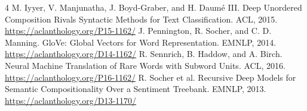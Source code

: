 \documentclass[11pt,letterpaper]{article}
\begin{document}
\begin{thebibliography}{4}
\small
{} M. Iyyer, V. Manjunatha, J. Boyd-Graber, and H. Daum\'e III.
Deep Unordered Composition Rivals Syntactic Methods for Text Classification.
ACL, 2015. \url{https://aclanthology.org/P15-1162/}
 J. Pennington, R. Socher, and C. D. Manning.
GloVe: Global Vectors for Word Representation. EMNLP, 2014.
\url{https://aclanthology.org/D14-1162/}
 R. Sennrich, B. Haddow, and A. Birch.
Neural Machine Translation of Rare Words with Subword Units. ACL, 2016.
\url{https://aclanthology.org/P16-1162/}
 R. Socher et al.
Recursive Deep Models for Semantic Compositionality Over a Sentiment Treebank.
EMNLP, 2013. \url{https://aclanthology.org/D13-1170/}
\end{thebibliography}
\end{document}
